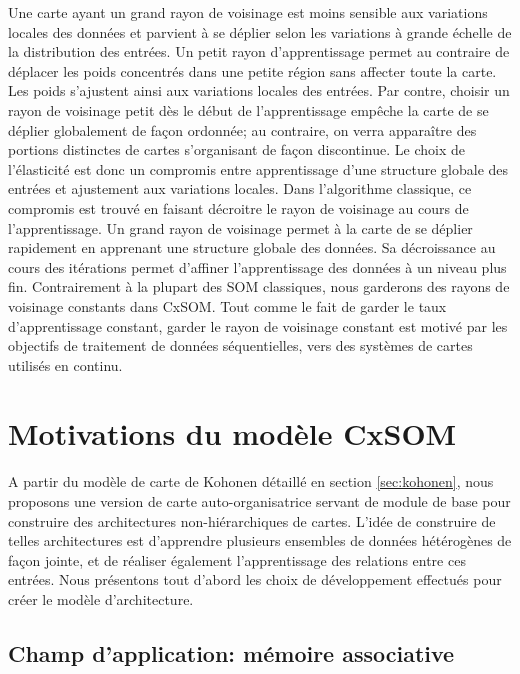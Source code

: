 \documentclass[../main]{subfiles}
\begin{document}
Une carte ayant un grand rayon de voisinage est moins sensible aux variations locales des données et parvient à se déplier selon les variations à grande échelle de la distribution des entrées.
Un petit rayon d'apprentissage permet au contraire de déplacer les poids concentrés dans une petite région sans affecter toute la carte. Les poids s'ajustent ainsi aux variations locales des entrées. Par contre, choisir un rayon de voisinage petit dès le début de l'apprentissage empêche la carte de se déplier globalement de façon ordonnée; au contraire, on verra apparaître des portions distinctes de cartes s'organisant de façon discontinue.
Le choix de l'élasticité est donc un compromis entre apprentissage d'une structure globale des entrées et ajustement aux variations locales.
Dans l'algorithme classique, ce compromis est trouvé en faisant décroitre le rayon de voisinage au cours de l'apprentissage. Un grand rayon de voisinage permet à la carte de se déplier rapidement en apprenant une structure globale des données. Sa décroissance au cours des itérations permet d'affiner l'apprentissage des données à un niveau plus fin. 
Contrairement à la plupart des SOM classiques, nous garderons des rayons de voisinage constants dans CxSOM. Tout comme le fait de garder le taux d'apprentissage constant, garder le rayon de voisinage constant est motivé par les objectifs de traitement de données séquentielles, vers des systèmes de cartes utilisés en continu.

\section{Motivations du modèle CxSOM}

A partir du modèle de carte de Kohonen détaillé en section \ref{sec:kohonen}, nous proposons une version de carte auto-organisatrice servant de module de base pour construire des architectures non-hiérarchiques de cartes. 
L'idée de construire de telles architectures est d'apprendre plusieurs ensembles de données hétérogènes de façon jointe, et de réaliser également l'apprentissage des relations entre ces entrées.
Nous présentons tout d'abord les choix de développement effectués pour créer le modèle d'architecture.

\subsection{Champ d'application: mémoire associative}
\end{document}

